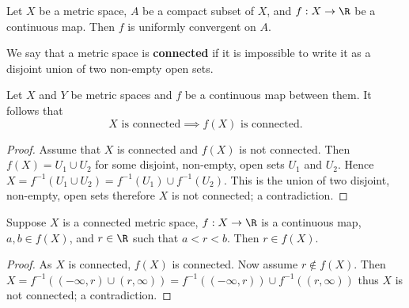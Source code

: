 \begin{theorem}[]
	Let $X$ be a metric space,
	$A$ be a compact subset of $X$,
	and $f: X \to \R$ be a continuous map.
	Then $f$ is uniformly convergent on $A$.
\end{theorem}

\begin{definition}[]
	We say that a metric space is \textbf{connected} if it is impossible
	to write it as a disjoint union of two non-empty open sets.
\end{definition}

\begin{theorem}[]
	Let $X$ and $Y$ be metric spaces and $f$ be a continuous map between
	them.
	It follows that
	\[
		\text{$X$ is connected} \implies
		\text{$f(X)$ is connected}.
	\]
\end{theorem}

\begin{proof}
	Assume that $X$ is connected and $f(X)$ is not connected.
	Then $f(X) = U_1 \cup U_2$ for some disjoint, 
	non-empty, open sets $U_1$ and $U_2$.
	Hence $
		X = f^{-1} \left( U_1 \cup U_2 \right) = f^{-1}(U_1) \cup f^{-1}(U_2)
	$. This is the union of two disjoint, non-empty, open sets therefore
	$X$ is not connected; a contradiction.
\end{proof}


\begin{theorem}
	Suppose $X$ is a connected metric space, 
	$f: X \to \R$ is a continuous map,
	$a, b \in f(X)$, and $r \in \R$ such that $a < r < b$.
	Then $r \in f(X)$.
\end{theorem}

\begin{proof}
	As $X$ is connected, $f(X)$ is connected.
	Now assume $r \not\in f(X)$.
	Then $
		X 
		= f^{-1}\left( (-\infty, r) \cup (r, \infty) \right)
		= f^{-1}((-\infty, r)) \cup f^{-1}((r, \infty))
	$ thus $X$ is not connected; a contradiction.
\end{proof}
